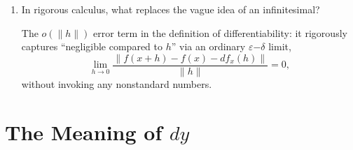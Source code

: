 \documentclass{self-check}
\begin{document}
\begin{enumerate}[resume, leftmargin=*, itemsep=8pt]
\begin{answer}
    \end{answer}
  \item In rigorous calculus, what replaces the vague idea of an infinitesimal?
    \begin{answer}
      The \(o(\|h\|)\) error term in the definition of differentiability: it rigorously captures ``negligible compared to \(h\)'' via an ordinary \(\varepsilon\)\(-\)\(\delta\) limit,
      \[ \lim_{h\to0}\frac{\|f(x+h)-f(x)-df_{x}(h)\|}{\|h\|}=0, \]
      without invoking any nonstandard numbers.
    \end{answer}
\end{enumerate}

\section{The Meaning of \texorpdfstring{\(dy\)}{dy}}
\end{document}
